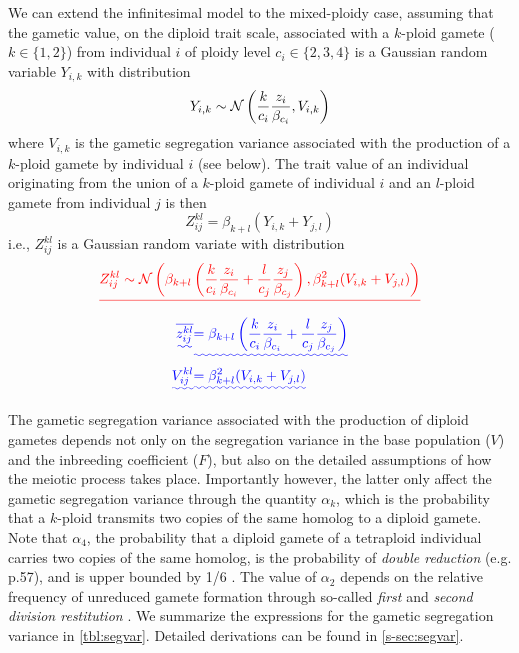 \documentclass[12pt,a4paper]{article}
\providecommand{\DIFadd}[1]{{\protect\color{blue}\uwave{#1}}} %
\providecommand{\DIFdel}[1]{{\protect\color{red}\sout{#1}}}                      %
\providecommand{\DIFaddbegin}{} %
\providecommand{\DIFaddend}{} %
\providecommand{\DIFdelbegin}{} %
\providecommand{\DIFdelend}{} %
\begin{document}
    We can extend the infinitesimal model to the mixed-ploidy case, assuming that the
    gametic value, on the diploid trait scale, associated with a $k$-ploid gamete ($k
    \in \{1,2\}$) from individual $i$ of ploidy level $c_i \in \{2,3,4\}$ is a
    Gaussian random variable $Y_{i,k}$ with distribution
    \begin{equation}
        Y_{i,k} \sim \mathcal{N}\left(\frac{k}{c_i}\frac{z_i}{\beta_{c_i}}, V_{i,k}\right)
        \label{eq:gamete}
    \end{equation}
    where $V_{i,k}$ is the gametic segregation variance associated with the
    production of a $k$-ploid gamete by individual $i$ (see below).
    The trait value of an individual originating from the union of a $k$-ploid
    gamete of individual $i$ and an $l$-ploid gamete from individual $j$ is then
      $$Z_{ij}^{kl} = \beta_{k+l}\left(Y_{i,k} + Y_{j,l}\right)$$
    i.e., $Z_{ij}^{kl}$ is a Gaussian random variate with distribution
        \DIFdelbegin \begin{displaymath}
  \DIFdel{Z_{ij}^{kl} \sim \Normal\left(
    \beta_{k+l} \left(
          \frac{k}{c_i}\frac{z_i}{\beta_{c_i}} 
        + \frac{l}{c_j}\frac{z_j}{\beta_{c_j}}\right), 
    \beta_{k+l}^2 (V_{i,k} + V_{j,l})\right)
}\end{displaymath}%
\DIFdelend \DIFaddbegin \DIFadd{$Z_{ij}^{kl} \sim \Normal\left(\overline{z_{ij}^{kl}},
        V_{ij}^{kl}\right)$
    where
    }\begin{align}
        \DIFadd{\overline{z_{ij}^{kl}} }&\DIFadd{= \beta_{k+l} \left(
              \frac{k}{c_i}\frac{z_i}{\beta_{c_i}} 
            + \frac{l}{c_j}\frac{z_j}{\beta_{c_j}}\right) \nonumber }\\
        \DIFadd{V_{ij}^{kl} }&\DIFadd{= \beta_{k+l}^2 (V_{i,k} + V_{j,l})
       \label{eq:oneline}
    }\end{align}\DIFaddend 

    The gametic segregation variance associated with the production of diploid
    gametes depends not only on the segregation variance in the base population
    ($V$) and the inbreeding coefficient ($F$), but also on the detailed
    assumptions of how the meiotic process takes place.
    Importantly however, the latter only affect the gametic segregation variance
    through the quantity $\alpha_k$, which is the probability that a $k$-ploid
    transmits two copies of the same homolog to a diploid gamete.
    Note that $\alpha_4$, the probability that a diploid gamete of a tetraploid
    individual carries two copies of the same homolog, is the probability of
    \textit{double reduction} (e.g. \cite{lynch1998} p.57), and is upper bounded by
    1/6 \citep{stift2008}.
    The value of $\alpha_2$ depends on the relative frequency of unreduced gamete
    formation through so-called \textit{first} and \textit{second division
    restitution} \citep{bretagnolle1995,storme2013}.
    We summarize the expressions for the gametic segregation variance in
    \cref{tbl:segvar}.
    Detailed derivations can be found in \cref{s-sec:segvar}.
\end{document}
